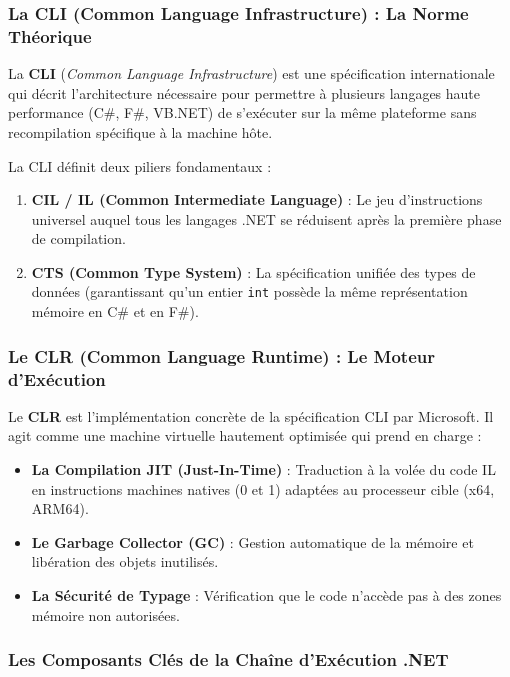 \subsubsection{La CLI (Common Language Infrastructure) : La Norme Théorique}

La \textbf{CLI} (\emph{Common Language Infrastructure}) est une spécification internationale qui décrit l'architecture nécessaire pour permettre à plusieurs langages haute performance (C\#, F\#, VB.NET) de s'exécuter sur la même plateforme sans recompilation spécifique à la machine hôte.

La CLI définit deux piliers fondamentaux :
\begin{enumerate}
    \item \textbf{CIL / IL (Common Intermediate Language)} : Le jeu d'instructions universel auquel tous les langages .NET se réduisent après la première phase de compilation.
    \item \textbf{CTS (Common Type System)} : La spécification unifiée des types de données (garantissant qu'un entier \texttt{int} possède la même représentation mémoire en C\# et en F\#).
\end{enumerate}

\subsubsection{Le CLR (Common Language Runtime) : Le Moteur d'Exécution}

Le \textbf{CLR} est l'implémentation concrète de la spécification CLI par Microsoft. Il agit comme une machine virtuelle hautement optimisée qui prend en charge :

\begin{itemize}
    \item \textbf{La Compilation JIT (Just-In-Time)} : Traduction à la volée du code IL en instructions machines natives (0 et 1) adaptées au processeur cible (x64, ARM64).
    \item \textbf{Le Garbage Collector (GC)} : Gestion automatique de la mémoire et libération des objets inutilisés.
    \item \textbf{La Sécurité de Typage} : Vérification que le code n'accède pas à des zones mémoire non autorisées.
\end{itemize}

\subsubsection{Les Composants Clés de la Chaîne d'Exécution .NET}

